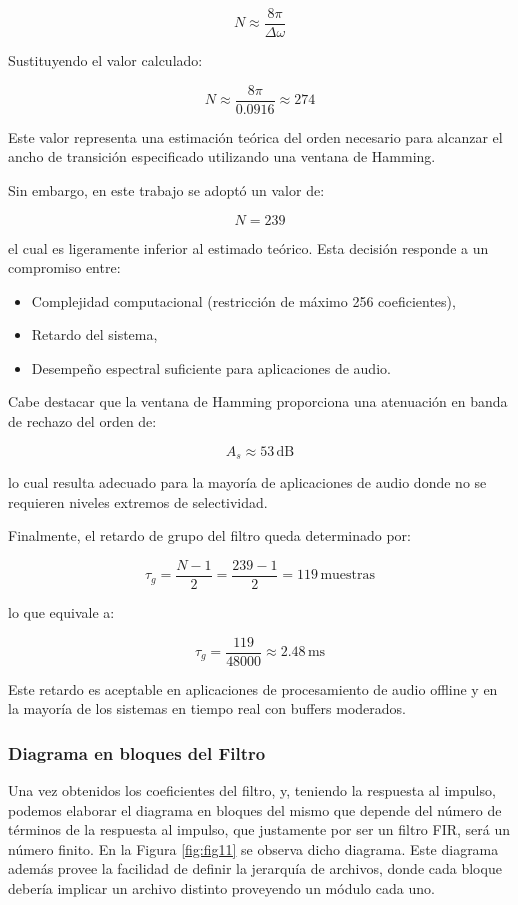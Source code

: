 \documentclass[a4,11pt]{article}
\begin{document}
\[
N \approx \frac{8\pi}{\Delta \omega}
\]

Sustituyendo el valor calculado:

\[
N \approx \frac{8\pi}{0.0916} \approx 274
\]

Este valor representa una estimación teórica del orden necesario para alcanzar el ancho de transición especificado utilizando una ventana de Hamming.

Sin embargo, en este trabajo se adoptó un valor de:

\[
N = 239
\]

el cual es ligeramente inferior al estimado teórico. Esta decisión responde a un compromiso entre:

\begin{itemize}
    \item Complejidad computacional (restricción de máximo 256 coeficientes),
    \item Retardo del sistema,
    \item Desempeño espectral suficiente para aplicaciones de audio.
\end{itemize}

Cabe destacar que la ventana de Hamming proporciona una atenuación en banda de rechazo del orden de:

\[
A_s \approx 53 \, \text{dB}
\]

lo cual resulta adecuado para la mayoría de aplicaciones de audio donde no se requieren niveles extremos de selectividad.

Finalmente, el retardo de grupo del filtro queda determinado por:

\[
\tau_g = \frac{N-1}{2} = \frac{239-1}{2} = 119 \, \text{muestras}
\]

lo que equivale a:

\[
\tau_g = \frac{119}{48000} \approx 2.48 \, \text{ms}
\]

Este retardo es aceptable en aplicaciones de procesamiento de audio offline y en la mayoría de los sistemas en tiempo real con buffers moderados.

\subsubsection{Diagrama en bloques del Filtro}
\label{sec:diagrama-en-bloques}
\par Una vez obtenidos los coeficientes del filtro, y, teniendo la respuesta al impulso, podemos elaborar el diagrama en bloques del mismo que depende del número de términos de la respuesta al impulso, que justamente por ser un filtro FIR, será un número finito. En la Figura \ref{fig:fig11} se observa dicho diagrama. Este diagrama además provee la facilidad de definir la jerarquía de archivos, donde cada bloque debería implicar un archivo distinto proveyendo un módulo cada uno.
\end{document}
